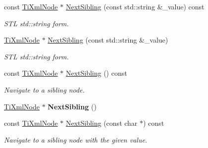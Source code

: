 \begin{DoxyCompactItemize}
\mbox{\label{class_ti_xml_node_a5f0bf3809d4a35456d28cc9522c26245}} 
const \hyperlink{class_ti_xml_node}{Ti\+Xml\+Node} $\ast$ \hyperlink{class_ti_xml_node_a5f0bf3809d4a35456d28cc9522c26245}{Next\+Sibling} (const std\+::string \&\+\_\+value) const
\begin{DoxyCompactList}\small\item\em S\+TL std\+::string form. \end{DoxyCompactList}\item 
\mbox{\label{class_ti_xml_node_a1757c1f4d01e8c9596ffdbd561c76aea}} 
\hyperlink{class_ti_xml_node}{Ti\+Xml\+Node} $\ast$ \hyperlink{class_ti_xml_node_a1757c1f4d01e8c9596ffdbd561c76aea}{Next\+Sibling} (const std\+::string \&\+\_\+value)
\begin{DoxyCompactList}\small\item\em S\+TL std\+::string form. \end{DoxyCompactList}\item 
\mbox{\label{class_ti_xml_node_ae99c572ac7901a15993ea7a4efaa10e7}} 
const \hyperlink{class_ti_xml_node}{Ti\+Xml\+Node} $\ast$ \hyperlink{class_ti_xml_node_ae99c572ac7901a15993ea7a4efaa10e7}{Next\+Sibling} () const
\begin{DoxyCompactList}\small\item\em Navigate to a sibling node. \end{DoxyCompactList}\item 
\mbox{\label{class_ti_xml_node_a4d05f7b1d7b470ac6887edd072d4892a}} 
\hyperlink{class_ti_xml_node}{Ti\+Xml\+Node} $\ast$ {\bfseries Next\+Sibling} ()
\item 
\mbox{\label{class_ti_xml_node_a0864ea784b53cdca0a37829d3391ca4b}} 
const \hyperlink{class_ti_xml_node}{Ti\+Xml\+Node} $\ast$ \hyperlink{class_ti_xml_node_a0864ea784b53cdca0a37829d3391ca4b}{Next\+Sibling} (const char $\ast$) const
\begin{DoxyCompactList}\small\item\em Navigate to a sibling node with the given \textquotesingle{}value\textquotesingle{}. \end{DoxyCompactList}\item 
\mbox{\label{class_ti_xml_node_a4080bc5cc8a5c139e7cf308669e850fc}} 

\end{DoxyCompactItemize}
